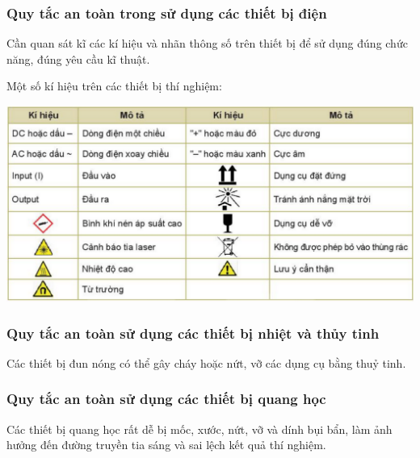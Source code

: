 \subsubsection{Quy tắc an toàn trong sử dụng các thiết bị điện}
Cần quan sát kĩ các kí hiệu và nhãn thông số trên thiết bị để sử dụng đúng chức năng, đúng yêu cầu kĩ thuật.

Một số kí hiệu trên các thiết bị thí nghiệm:
\begin{center}
	\includegraphics[scale=0.7]{../figs/G10-2-1}
\end{center}
\subsubsection{Quy tắc an toàn sử dụng các thiết bị nhiệt và thủy tinh}
Các thiết bị đun nóng có thể gây cháy hoặc nứt, vỡ các dụng cụ bằng thuỷ tinh.
\subsubsection{Quy tắc an toàn sử dụng các thiết bị quang học}
Các thiết bị quang học rất dễ bị mốc, xước, nứt, vỡ và dính bụi bẩn, làm ảnh hưởng đến đường truyền tia sáng và sai lệch kết quả thí nghiệm.
